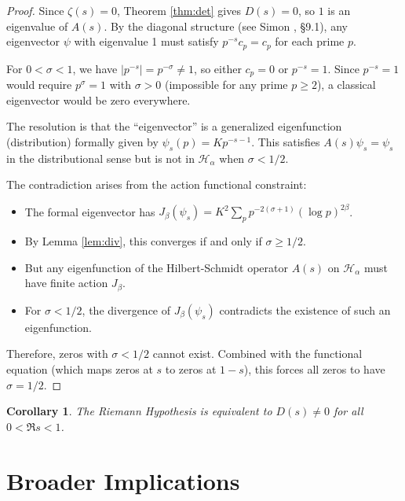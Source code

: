\documentclass[12pt]{article}
\newtheorem{corollary}[theorem]{Corollary}
\theoremstyle{definition}
\theoremstyle{remark}
\newcommand{\Hspace}{\mathcal H}
\newcommand{\Zeta}{\zeta}
\begin{document}
\begin{proof}
Since \(\Zeta(s)=0\), Theorem \ref{thm:det} gives \(D(s)=0\), so
\(1\) is an eigenvalue of \(A(s)\).
By the diagonal structure (see Simon \cite{simon}, \S9.1),
any eigenvector \(\psi\) with eigenvalue 1 must satisfy
\(p^{-s}c_p = c_p\) for each prime \(p\).

For \(0 < \sigma < 1\), we have \(|p^{-s}| = p^{-\sigma} \neq 1\),
so either \(c_p = 0\) or \(p^{-s} = 1\).
Since \(p^{-s} = 1\) would require \(p^{\sigma} = 1\) with \(\sigma > 0\)
(impossible for any prime \(p \geq 2\)),
a classical eigenvector would be zero everywhere.

The resolution is that the ``eigenvector'' is a generalized eigenfunction 
(distribution) formally given by \(\psi_s(p) = K p^{-s-1}\).
This satisfies \(A(s)\psi_s = \psi_s\) in the distributional sense
but is not in \(\Hspace_{\alpha}\) when \(\sigma < 1/2\).

The contradiction arises from the action functional constraint:
\begin{itemize}
\item The formal eigenvector has \(J_\beta(\psi_s) = K^2 \sum_p p^{-2(\sigma+1)} (\log p)^{2\beta}\).
\item By Lemma \ref{lem:div}, this converges if and only if \(\sigma \geq 1/2\).
\item But any eigenfunction of the Hilbert-Schmidt operator \(A(s)\) on \(\Hspace_{\alpha}\)
      must have finite action \(J_\beta\).
\item For \(\sigma < 1/2\), the divergence of \(J_\beta(\psi_s)\) contradicts
      the existence of such an eigenfunction.
\end{itemize}

Therefore, zeros with \(\sigma < 1/2\) cannot exist. Combined with the
functional equation (which maps zeros at \(s\) to zeros at \(1-s\)),
this forces all zeros to have \(\sigma = 1/2\).
\end{proof}

\begin{corollary}
The Riemann Hypothesis is equivalent to  
\(D(s)\neq0\) for all \(0<\Re s<1\).
\end{corollary}

\section{Broader Implications}
\end{document}

